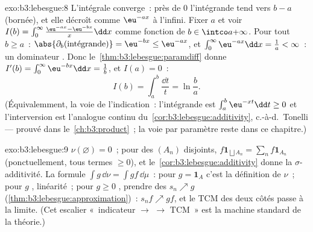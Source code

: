 \begin{solution}{exo:b3:lebesgue:8}
L'intégrale converge~: près de $0$ l'intégrande tend vers
$b - a$ (bornée), et elle décroît comme $\eu^{-ax}$ à
l'infini. Fixer $a$ et voir $I(b) =
\int_0^\infty\frac{\eu^{-ax} - \eu^{-bx}}x\dd x$ comme
fonction de $b \in \intco a{+\infty}$. Pour tout $b \geq
a$~: $\abs{\partial_b(\text{intégrande})} = \eu^{-bx}
\leq \eu^{-ax}$, et $\int_0^\infty\eu^{-ax}\dd x =
\frac1a < \infty$~: un dominateur . Donc
le~\cref{thm:b3:lebesgue:paramdiff} donne $I'(b) =
\int_0^\infty\eu^{-bx}\dd x = \frac1b$, et $I(a) = 0$~:
\[
I(b) = \int_a^b\frac{\dd t}t = \ln\frac ba .
\]
(Équivalemment, la voie de l'indication~: l'intégrande est
$\int_a^b\eu^{-xt}\dd t \geq 0$ et l'interversion est
l'analogue continu du~\cref{cor:b3:lebesgue:additivity},
c.-à-d.\ Tonelli --- prouvé dans
le~\cref{ch:b3:product}~; la voie par paramètre reste dans
ce chapitre.)
\end{solution}

\begin{solution}{exo:b3:lebesgue:9}
$\nu(\varnothing) = 0$~; pour des $(A_n)$ disjoints,
$f\mathbf 1_{\bigsqcup A_n} = \sum_nf\mathbf 1_{A_n}$
(ponctuellement, tous termes $\geq 0$), et
le~\cref{cor:b3:lebesgue:additivity} donne la
$\sigma$-additivité. La formule $\int g\,\dd\nu = \int
gf\,\dd\mu$~: pour $g = \mathbf 1_A$ c'est la définition de
$\nu$~; pour $g$ , linéarité~; pour $g \geq 0$
, prendre des  $s_n \nearrow g$
(\cref{thm:b3:lebesgue:approximation})~: $s_nf \nearrow
gf$, et le TCM des deux côtés passe à la limite. (Cet
escalier «~indicateur $\to$  $\to$ TCM~» est la
machine standard de la théorie.)
\end{solution}

